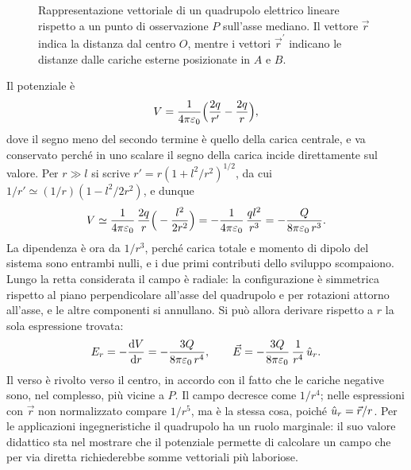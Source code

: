 \documentclass[11pt,a4paper]{article}
\begin{document}
\begin{figure}[htbp]
	\caption{Rappresentazione vettoriale di un quadrupolo elettrico lineare rispetto a un punto di osservazione $P$ sull'asse mediano. Il vettore $\vec{r}$ indica la distanza dal centro $O$, mentre i vettori $\vec{r}^{\prime}$ indicano le distanze dalle cariche esterne posizionate in $A$ e $B$.}
	\label{fig:quadrupolo_asse_simmetria}
\end{figure}
Il potenziale è
\[
V=\frac{1}{4\pi\varepsilon_0}\Big(\frac{2q}{r'}-\frac{2q}{r}\Big),
\]
dove il segno meno del secondo termine è quello della carica centrale, e va conservato perché in uno scalare il segno della carica incide direttamente sul valore. Per $r\gg l$ si scrive $r'=r(1+l^2/r^2)^{1/2}$, da cui $1/r'\simeq(1/r)(1-l^2/2r^2)$, e dunque
\[
V\simeq\frac{1}{4\pi\varepsilon_0}\,\frac{2q}{r}\Big(-\frac{l^2}{2r^2}\Big)=-\frac{1}{4\pi\varepsilon_0}\,\frac{ql^2}{r^3}=-\frac{Q}{8\pi\varepsilon_0\,r^3}.
\]
La dipendenza è ora da $1/r^3$, perché carica totale e momento di dipolo del sistema sono entrambi nulli, e i due primi contributi dello sviluppo scompaiono. Lungo la retta considerata il campo è radiale: la configurazione è simmetrica rispetto al piano perpendicolare all'asse del quadrupolo e per rotazioni attorno all'asse, e le altre componenti si annullano. Si può allora derivare rispetto a $r$ la sola espressione trovata:
\[
E_r=-\frac{\mathrm{d} V}{\mathrm{d} r}=-\frac{3Q}{8\pi\varepsilon_0\,r^4},\qquad
\vec E=-\frac{3Q}{8\pi\varepsilon_0}\,\frac{1}{r^4}\,\hat{u}_r .
\]
Il verso è rivolto verso il centro, in accordo con il fatto che le cariche negative sono, nel complesso, più vicine a $P$. Il campo decresce come $1/r^4$; nelle espressioni con $\vec r$ non normalizzato compare $1/r^5$, ma è la stessa cosa, poiché $\hat{u}_r=\vec r/r$. Per le applicazioni ingegneristiche il quadrupolo ha un ruolo marginale: il suo valore didattico sta nel mostrare che il potenziale permette di calcolare un campo che per via diretta richiederebbe somme vettoriali più laboriose.
\end{document}
